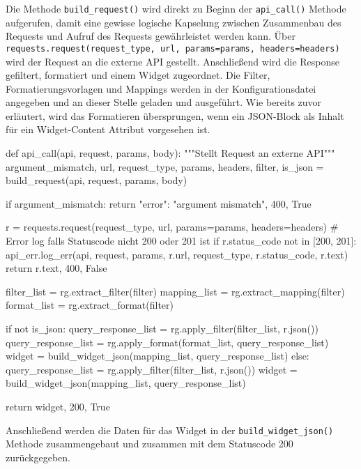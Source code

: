 Die Methode \texttt{build\_{}request()} wird direkt zu Beginn der \texttt{api\_{}call()} Methode aufgerufen, damit eine gewisse logische Kapselung zwischen Zusammenbau des Requests und Aufruf des Requests gewährleistet werden kann. Über \texttt{requests.request(request\_{}type, url, params=params, headers=headers)} wird der Request an die externe API gestellt. Anschließend wird die Response gefiltert, formatiert und einem Widget zugeordnet. Die Filter, Formatierungsvorlagen und Mappings werden in der Konfigurationsdatei angegeben und an dieser Stelle geladen und ausgeführt. Wie bereits zuvor erläutert, wird das Formatieren übersprungen, wenn ein JSON-Block als Inhalt für ein Widget-Content Attribut vorgesehen ist.  

\begin{python}
def api_call(api, request, params, body):
    """Stellt Request an externe API"""
    argument_mismatch, url, request_type, params, headers, filter, is_json = build_request(api, request, params, body)

    if argument_mismatch:
        return {"error": "argument mismatch"}, 400, True

    r = requests.request(request_type, url, params=params, headers=headers)
    # Error log falls Statuscode nicht 200 oder 201 ist
    if r.status_code not in [200, 201]:
        api_err.log_err(api, request, params, r.url, request_type, r.status_code, r.text)
        return r.text, 400, False

    filter_list = rg.extract_filter(filter)
    mapping_list = rg.extract_mapping(filter)
    format_list = rg.extract_format(filter)

    if not is_json:
        query_response_list = rg.apply_filter(filter_list, r.json())
        query_response_list = rg.apply_format(format_list, query_response_list)
        widget = build_widget_json(mapping_list, query_response_list)
    else:
        query_response_list = rg.apply_filter(filter_list, r.json())
        widget = build_widget_json(mapping_list, query_response_list)

    return widget, 200, True
\end{python}

Anschließend werden die Daten für das Widget in der \texttt{build\_{}widget\_{}json()} Methode zusammengebaut und zusammen mit dem Statuscode 200 zurückgegeben. 

